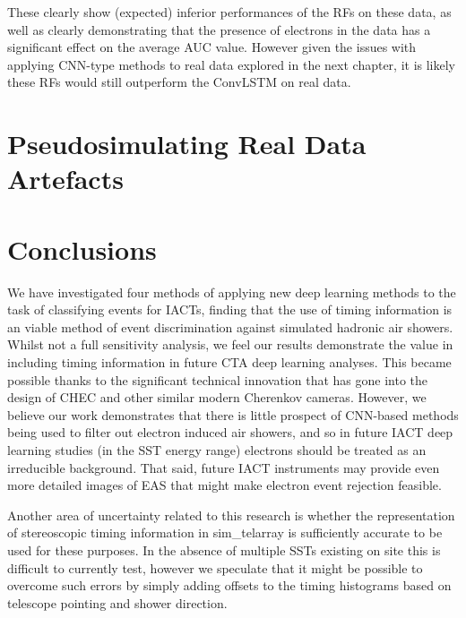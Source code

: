 These clearly show (expected) inferior performances of the RFs on these data, as well as clearly demonstrating that the presence of electrons in the data has a significant effect on the average AUC value. However given the issues with applying CNN-type methods to real data explored in the next chapter, it is likely these RFs would still outperform the ConvLSTM on real data.

\section{Pseudosimulating Real Data Artefacts}

\section{Conclusions} \label{Conclusions}
We have investigated four methods of applying new deep learning methods to the task of classifying events for IACTs, finding that the use of timing information is an viable method of event discrimination against simulated hadronic air showers. Whilst not a full sensitivity analysis, we feel our results demonstrate the value in including timing information in future CTA deep learning analyses. This became possible thanks to the significant technical innovation that has gone into the design of CHEC and other similar modern Cherenkov cameras. However, we believe our work demonstrates that there is little prospect of CNN-based methods being used to filter out electron induced air showers, and so in future IACT deep learning studies (in the SST energy range) electrons should be treated as an irreducible background. That said, future IACT instruments may provide even more detailed images of EAS that might make electron event rejection feasible.

Another area of uncertainty related to this research is whether the representation of stereoscopic timing information in sim\_telarray is sufficiently accurate to be used for these purposes. In the absence of multiple SSTs existing on site this is difficult to currently test, however we speculate that it might be possible to overcome such errors by simply adding offsets to the timing histograms based on telescope pointing and shower direction.


